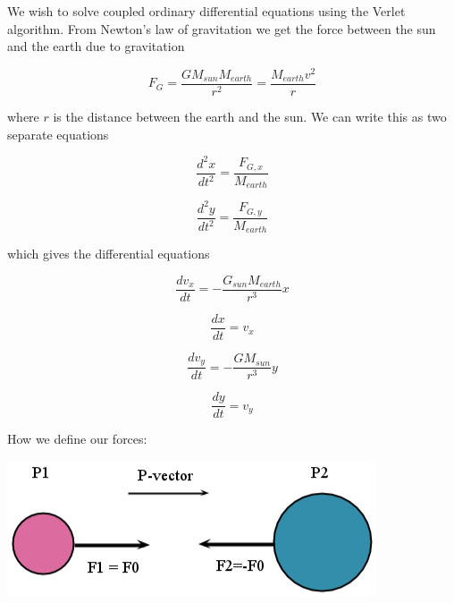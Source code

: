 \documentclass[11pt]{article}
\begin{document}
\begin{flushleft}
We wish to solve coupled ordinary differential equations using the Verlet algorithm. From Newton's law of gravitation we get the force between the sun and the earth due to gravitation

\begin{equation}\label{Newton gravitational}
F_G = \frac{G M_{sun} M_{earth}}{r^2} = \frac{M_{earth}v^2}{r}
\end{equation}

where $r$ is the distance between the earth and the sun. We can write this as two separate equations

\begin{equation}
\frac{d^2x}{dt^2} = \frac{F_{G,x}}{M_{earth}}
\end{equation}

\begin{equation}
\frac{d^2y}{dt^2} = \frac{F_{G,y}}{M_{earth}}
\end{equation}

which gives the differential equations

\begin{equation}
\frac{dv_x}{dt} = -\frac{G_{sun}M_{earth}}{r^3} x
\end{equation}

\begin{equation}
\frac{dx}{dt} = v_x
\end{equation}

\begin{equation}
\frac{dv_y}{dt} = - \frac{GM_{sun}}{r^3} y
\end{equation}

\begin{equation}
\frac{dy}{dt} = v_y
\end{equation}

How we define our forces:

\begin{center}
\includegraphics[scale=0.6]{figure1.png}
\end{center}
\end{flushleft}
\end{document}
